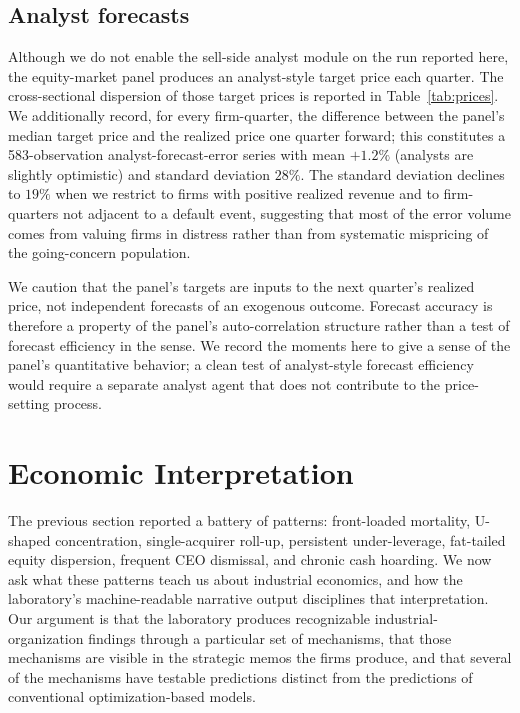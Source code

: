 \documentclass[11pt]{article}
\begin{document}
\subsection{Analyst forecasts}

Although we do not enable the sell-side analyst module on the run
reported here, the equity-market panel produces an analyst-style
target price each quarter. The cross-sectional dispersion of those
target prices is reported in Table~\ref{tab:prices}. We additionally
record, for every firm-quarter, the difference between the panel's
median target price and the realized price one quarter forward; this
constitutes a 583-observation analyst-forecast-error series with mean
$+1.2\%$ (analysts are slightly optimistic) and standard deviation
$28\%$. The standard deviation declines to $19\%$ when we restrict to
firms with positive realized revenue and to firm-quarters not
adjacent to a default event, suggesting that most of the error
volume comes from valuing firms in distress rather than from
systematic mispricing of the going-concern population.

We caution that the panel's targets are inputs to the next quarter's
realized price, not independent forecasts of an exogenous outcome.
Forecast accuracy is therefore a property of the panel's
auto-correlation structure rather than a test of forecast efficiency
in the \citet{fama1970efficient} sense. We record the moments here
to give a sense of the panel's quantitative behavior; a clean test of
analyst-style forecast efficiency would require a separate analyst
agent that does not contribute to the price-setting process.

\section{Economic Interpretation}\label{sec:mechanisms}

The previous section reported a battery of patterns: front-loaded
mortality, U-shaped concentration, single-acquirer roll-up, persistent
under-leverage, fat-tailed equity dispersion, frequent CEO dismissal,
and chronic cash hoarding. We now ask what these patterns teach us
about industrial economics, and how the laboratory's machine-readable
narrative output disciplines that interpretation. Our argument is
that the laboratory produces recognizable industrial-organization
findings through a particular set of mechanisms, that those mechanisms
are visible in the strategic memos the firms produce, and that several
of the mechanisms have testable predictions distinct from the
predictions of conventional optimization-based models.
\end{document}
